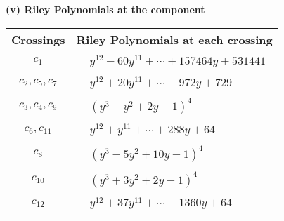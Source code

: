 \documentclass[1p]{elsarticle_modified}
\theoremstyle{definition}
\begin{document}
\newpage\renewcommand{\arraystretch}{1}
\flushleft \textbf{(v) Riley Polynomials at the component}\newline \\
\begin{tabular}{m{50pt}|m{274pt}}
Crossings & \hspace{64pt}Riley Polynomials at each crossing \\
\hline $$\begin{aligned}c_{1}\end{aligned}$$&$\begin{aligned}
&y^{12}-60 y^{11}+\cdots+157464 y+531441
\end{aligned}$\\
\hline $$\begin{aligned}c_{2},c_{5},c_{7}\end{aligned}$$&$\begin{aligned}
&y^{12}+20 y^{11}+\cdots-972 y+729
\end{aligned}$\\
\hline $$\begin{aligned}c_{3},c_{4},c_{9}\end{aligned}$$&$\begin{aligned}
&(y^3- y^2+2 y-1)^4
\end{aligned}$\\
\hline $$\begin{aligned}c_{6},c_{11}\end{aligned}$$&$\begin{aligned}
&y^{12}+y^{11}+\cdots+288 y+64
\end{aligned}$\\
\hline $$\begin{aligned}c_{8}\end{aligned}$$&$\begin{aligned}
&(y^3-5 y^2+10 y-1)^4
\end{aligned}$\\
\hline $$\begin{aligned}c_{10}\end{aligned}$$&$\begin{aligned}
&(y^3+3 y^2+2 y-1)^4
\end{aligned}$\\
\hline $$\begin{aligned}c_{12}\end{aligned}$$&$\begin{aligned}
&y^{12}+37 y^{11}+\cdots-1360 y+64
\end{aligned}$\\
\hline
\end{tabular}\\~\\
\end{document}

